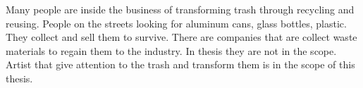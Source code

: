 
Many people are inside the business of transforming trash through recycling and reusing. People on the streets looking for aluminum cans, glass bottles, plastic. They collect and sell them to survive. There are companies that are collect waste materials to regain them to the industry. In thesis they are not in the scope. Artist that give attention to the trash and transform them is in the scope of this thesis.


